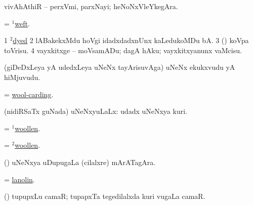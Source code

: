 \bentry
{} 
\gl{\nA}
\expl{}
\bmng
vivAhAthiR -- perxVmi, parxNayi; heNoNxVleYkegAra. 
\emng
\eentry

\bentry
{} 
\gl{\nA}
\expl{}
\bmng
= \hyperlink{weft(1)}{$^1$weft}. 
\emng
\eentry

\bentry
{} 
\gl{\nA}
\enum
\emng

\noindent
\gl{\pagu}
\expl{}
\bmng
\bnum
\num{1} \hyperref{kandict_d.pdf}{D}{dye(2) nuga(2)}{$^2$dyed}  
\num{2}  lABakekxMdu hoVgi idadxdadxnUnx kaLedukoMDu bA. 
\num{3}  (\ashi) koVpa toVrisu. 
\num{4}  vayxkitxge -- moVsamADu; dagA hAku; vayxkitxyanunx vaMcisu. 
\enum
\emng
\eentry

\bentry
{} 
\gl{\nA}
\expl{}
\bmng
(giDeDxLeya yA udedxLeya uNeNx tayArisuvAga) uNeNx ekukxvudu yA hiMjuvudu. 
\emng
\eentry

\bentry
{} 
\gl{\nA}
\expl{}
\bmng
= \hyperlink{wool-carding}{wool-carding}. 
\emng
\eentry

\bentry
{} 
\gl{\gu}
\expl{}
\bmng
(nidiRSaTx guNada) uNeNxyuLaLx:  udadx uNeNxya kuri. 
\emng
\eentry

\bentry
{} 
\gl{\gu}
\expl{}
\bmng
= \hyperlink{woollen(1)}{$^1$woollen}. 
\emng
\eentry

\bentry
{} 
\gl{\nA}
\expl{}
\bmng
= \hyperlink{woollen(2)}{$^2$woollen}. 
\emng
\eentry

\bentry
{} 
\gl{\nA}
\expl{}
\bmng
(\ca) uNeNxya uDupugaLa (cilalxre) mArATagAra. 
\emng
\eentry

\bentry
{} 
\gl{\nA}
\expl{}
\bmng
= \hyperref{kandict_l.pdf}{L}{lanolin}{lanolin}. 
\emng
\eentry

\bentry
{} 
\gl{\nA}
\expl{}
\bmng
(\birx) tupupxLu camaR; tupapxTa tegedilalxda kuri \mo vugaLa camaR. 
\emng
\eentry

